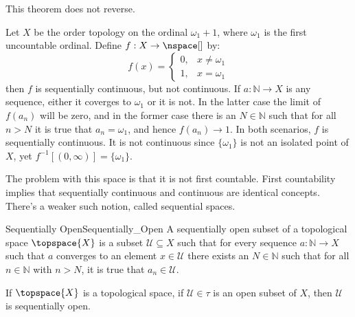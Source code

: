 \documentclass{article}                                                        %
\begin{document}
            This theorem does not reverse.
            \begin{example}
                Let $X$ be the order topology on the ordinal $\omega_{1}+1$, where
                $\omega_{1}$ is the first uncountable ordinal. Define
                $f:X\rightarrow\nspace[]$ by:
                \begin{equation}
                    f(x)=
                    \begin{cases}
                        0,&x\ne\omega_{1}\\
                        1,&x=\omega_{1}
                    \end{cases}
                \end{equation}
                then $f$ is sequentially continuous, but not continuous. If
                $a:\mathbb{N}\rightarrow{X}$ is any sequence, either it coverges to
                $\omega_{1}$ or it is not. In the latter case the limit of
                $f(a_{n})$ will be zero, and in the former case there is an
                $N\in\mathbb{N}$ such that for all $n>N$ it is true that
                $a_{n}=\omega_{1}$, and hence $f(a_{n})\rightarrow{1}$. In both
                scenarios, $f$ is sequentially continuous. It is not continuous
                since $\{\omega_{1}\}$ is not an isolated point of $X$, yet
                $f^{\minus{1}}[(0,\infty)]=\{\omega_{1}\}$.
            \end{example}
            The problem with this space is that it is not first countable. First
            countability implies that sequentially continuous and continuous are
            identical concepts. There's a weaker such notion, called sequential
            spaces.
            \begin{fdefinition}{Sequentially Open}{Sequentially_Open}
                A sequentially open subset of a topological space $\topspace{X}$
                is a subset $\mathcal{U}\subseteq{X}$ such that for every sequence
                $a:\mathbb{N}\rightarrow{X}$ such that $a$ converges to an element
                $x\in\mathcal{U}$ there exists an $N\in\mathbb{N}$ such that for all
                $n\in\mathbb{N}$ with $n>N$, it is true that $a_{n}\in\mathcal{U}$.
            \end{fdefinition}
            \begin{theorem}
                \label{thm:Open_is_Seq_Open}%
                If $\topspace{X}$ is a topological space, if $\mathcal{U}\in\tau$ is
                an open subset of $X$, then $\mathcal{U}$ is sequentially open.
            \end{theorem}
\end{document}
